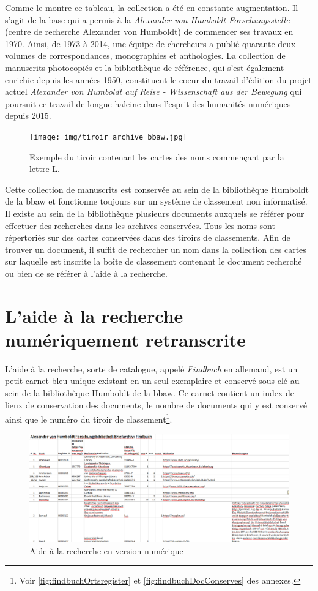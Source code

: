 \documentclass[a4paper, 12pt, twoside]{book}
\begin{document}
Comme le montre ce tableau, la collection a été en constante augmentation. Il s'agit de la base qui a permis à la \textit{Alexander-von-Humboldt-Forschungsstelle} (centre de recherche Alexander von Humboldt) de commencer ses travaux en 1970. Ainsi, de 1973 à 2014, une équipe de chercheurs a publié quarante-deux volumes de correspondances, monographies et anthologies. La collection de manuscrits photocopiés et la bibliothèque de référence, qui s'est également enrichie depuis les années 1950, constituent le coeur du travail d'édition du projet actuel \textit{Alexander von Humboldt auf Reise - Wissenschaft aus der Bewegung} qui poursuit ce travail de longue haleine dans l'esprit des humanités numériques depuis 2015.

\begin{figure}
\centering
\texttt{[image: img/tiroir\_archive\_bbaw.jpg]}
\caption{Exemple du tiroir contenant les cartes des noms commençant par la lettre L.}
\end{figure}

Cette collection de manuscrits est conservée au sein de la bibliothèque Humboldt de la \gls{bbaw} et fonctionne toujours sur un système de classement non informatisé. Il existe au sein de la bibliothèque plusieurs documents auxquels se référer pour effectuer des recherches dans les archives conservées. Tous les noms sont répertoriés sur des cartes conservées dans des tiroirs de classements. Afin de trouver un document, il suffit de rechercher un nom dans la collection des cartes sur laquelle est inscrite la boîte de classement contenant le document recherché ou bien de se référer à l'aide à la recherche. 

\section{L'aide à la recherche numériquement retranscrite}
L'aide à la recherche, sorte de catalogue, appelé \textit{Findbuch} en allemand, est un petit carnet bleu unique existant en un seul exemplaire et conservé sous clé au sein de la bibliothèque Humboldt de la \gls{bbaw}. Ce carnet contient un index de lieux de conservation des documents, le nombre de documents qui y est conservé ainsi que le numéro du tiroir de classement\footnote{Voir \autoref{fig:findbuchOrtsregister} et \autoref{fig:findbuchDocConserves} des annexes.}.
\begin{figure}[h]
    \centering
    \caption{Aide à la recherche en version numérique}
    \includegraphics[scale=0.4]{img/findbuch_numérisée.png}
    \hfill
\end{figure}
\end{document}
